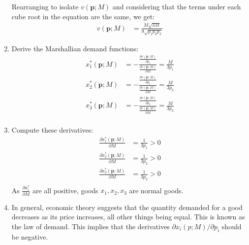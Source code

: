 \documentclass[UTF8,titlepage]{article}
\numberwithin{figure}{section}
\begin{document}
\begin{enumerate}
        Rearranging to isolate $v(\textbf{p}; M)$ and considering that the terms under each cube root in the equation are the same, we get:
        \begin{align*}
            v(\textbf{p}; M) &= \frac{M \sqrt{3M}}{9\sqrt{p_1 p_2 p_3}}
            \end{align*}
        \item Derive the Marshallian demand functions:
        \begin{align*}
            x_1^*(\textbf{p}; M) &= - \frac{\frac{\partial v(\textbf{p}; M)}{\partial p_1}}{\frac{\partial v(\textbf{p}; M)}{\partial M}} = \frac{M}{3p_1} \\
            x_2^*(\textbf{p}; M) &= - \frac{\frac{\partial v(\textbf{p}; M)}{\partial p_2}}{\frac{\partial v(\textbf{p}; M)}{\partial M}} = \frac{M}{3p_2} \\
            x_3^*(\textbf{p}; M) &= - \frac{\frac{\partial v(\textbf{p}; M)}{\partial p_3}}{\frac{\partial v(\textbf{p}; M)}{\partial M}} = \frac{M}{3p_3} \\
        \end{align*}  
        \item Compute these derivatives:
        \begin{align*}
            \frac{\partial x_1^*(\textbf{p}; M)}{\partial M} &= \frac{1}{3p_1} > 0\\
            \frac{\partial x_2^*(\textbf{p}; M)}{\partial M} &= \frac{1}{3p_2} > 0\\
            \frac{\partial x_3^*(\textbf{p}; M)}{\partial M} &= \frac{1}{3p_3} > 0\\
        \end{align*}
        As $\frac{\partial x_i^*}{\partial M}$ are all positive, goods $x_1, x_2, x_3$ are normal goods.
        \item In general, economic theory suggests that the quantity demanded for a good decreases as its price increases, all other things being equal. This is known as the law of demand. This implies that the derivatives $\partial x_i(p;M) / \partial p_i$ should be negative.
\end{enumerate}
\clearpage
\end{document}
